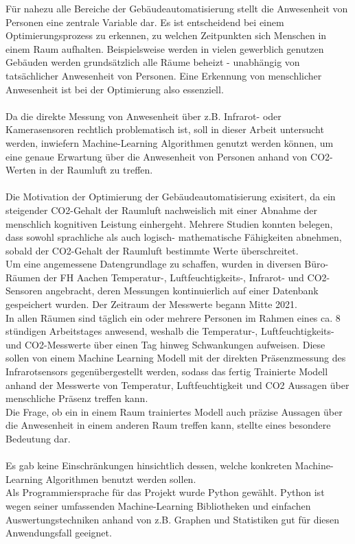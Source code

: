 Für nahezu alle Bereiche der Gebäudeautomatisierung stellt die Anwesenheit 
von Personen eine zentrale Variable dar. Es ist entscheidend bei einem Optimierungsprozess zu erkennen, zu
welchen Zeitpunkten sich Menschen in einem Raum aufhalten. Beispielsweise werden in vielen gewerblich 
genutzen Gebäuden werden grundsätzlich alle Räume beheizt - unabhängig von tatsächlicher Anwesenheit von Personen. 
Eine Erkennung von menschlicher Anwesenheit ist bei der Optimierung also essenziell.\\\\
Da die direkte Messung von Anwesenheit über z.B. Infrarot- oder Kamerasensoren rechtlich problematisch ist, 
soll in dieser Arbeit untersucht werden, inwiefern Machine-Learning Algorithmen genutzt werden können, 
um eine genaue Erwartung über die Anwesenheit von Personen anhand von CO2-Werten in der Raumluft zu treffen.\\\\
Die Motivation der Optimierung der Gebäudeautomatisierung exisitert, da ein steigender CO2-Gehalt der 
Raumluft nachweislich mit einer Abnahme der menschlich kognitiven Leistung einhergeht. Mehrere Studien
konnten belegen, dass sowohl sprachliche als auch logisch- mathematische Fähigkeiten abnehmen, sobald 
der CO2-Gehalt der  Raumluft bestimmte Werte überschreitet.\\ 
Um eine angemessene Datengrundlage zu schaffen, wurden in diversen Büro-Räumen der FH Aachen Temperatur-,
Luftfeuchtigkeits-, Infrarot- und CO2-Sensoren angebracht, deren Messungen kontinuierlich auf einer Datenbank
gespeichert wurden. Der Zeitraum der Messwerte begann Mitte 2021.\\
In allen Räumen sind täglich ein oder mehrere
Personen im Rahmen eines ca. 8 stündigen Arbeitstages anwesend, weshalb die Temperatur-, Luftfeuchtigkeits-
und CO2-Messwerte über einen Tag hinweg Schwankungen aufweisen. Diese sollen von einem Machine Learning Modell
mit der direkten Präsenzmessung des Infrarotsensors gegenübergestellt werden, sodass das fertig Trainierte Modell
anhand der Messwerte von Temperatur, Luftfeuchtigkeit und CO2 Aussagen über menschliche Präsenz treffen kann.\\
Die Frage, ob ein in einem Raum trainiertes Modell auch präzise Aussagen über die Anwesenheit in einem anderen Raum
treffen kann, stellte eines besondere Bedeutung dar.\\\\
Es gab keine Einschränkungen hinsichtlich dessen, welche konkreten Machine-Learning Algorithmen 
benutzt werden sollen.\\
Als Programmiersprache für das Projekt wurde Python gewählt. Python ist wegen seiner umfassenden
Machine-Learning Bibliotheken und einfachen Auswertungstechniken anhand von z.B. Graphen und Statistiken 
gut für diesen Anwendungsfall geeignet.



